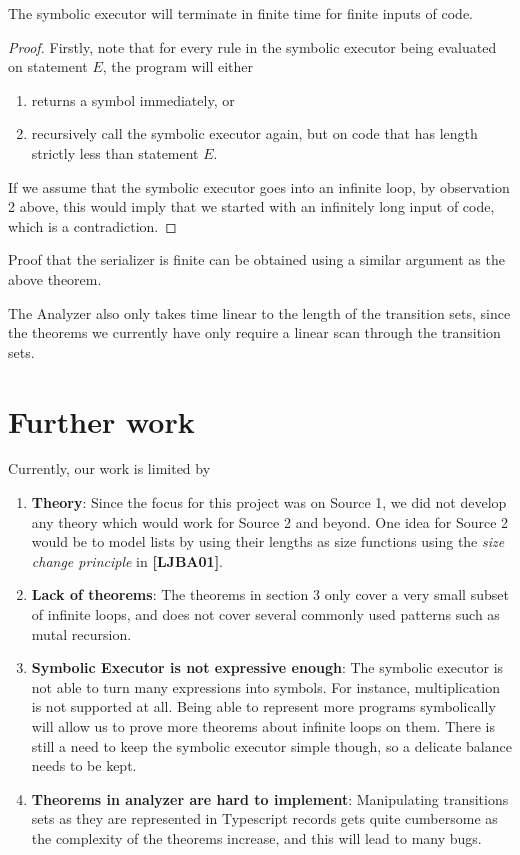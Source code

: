 \begin{theorem}

\end{theorem}
The symbolic executor will terminate in finite time for finite inputs of code.


\begin{proof}
\noindent
Firstly, note that for every rule in the symbolic executor being evaluated on statement $E$, the program will either
\begin{enumerate}
\item returns a symbol immediately, or
\item recursively call the symbolic executor again, but on code that has length strictly less than statement $E$.
\end{enumerate}

If we assume that the symbolic executor goes into an infinite loop, by observation 2 above, this would imply
that we started with an infinitely long input of code, which is a contradiction.

\end{proof}

Proof that the serializer is finite can be obtained using a similar argument as the above theorem.

The Analyzer also only takes time linear to the length of the transition sets,
since the theorems we currently have only require a linear scan through the transition sets.

\section{Further work}
Currently, our work is limited by
\begin{enumerate}
\item \textbf{Theory}: Since the focus for this project was on Source 1, we did not develop any theory
  which would work for Source 2 and beyond. One idea for Source 2 would be to model lists by using
  their lengths as size functions using the {\it size change principle} in \textbf{[LJBA01]}.
\item \textbf{Lack of theorems}: The theorems in section 3 only cover a very small subset of infinite loops,
  and does not cover several commonly used patterns such as mutal recursion.
\item \textbf{Symbolic Executor is not expressive enough}: The symbolic executor is not able to turn many
  expressions into symbols. For instance, multiplication is not supported at all. Being able to
  represent more programs symbolically will allow us to prove more theorems about infinite loops on them.
  There is still a need to keep the symbolic executor simple though, so a delicate balance needs to be kept.
\item \textbf{Theorems in analyzer are hard to implement}: Manipulating transitions sets as they are
  represented in Typescript records gets quite cumbersome as the complexity of the theorems increase, and
  this will lead to many bugs.
\end{enumerate}

